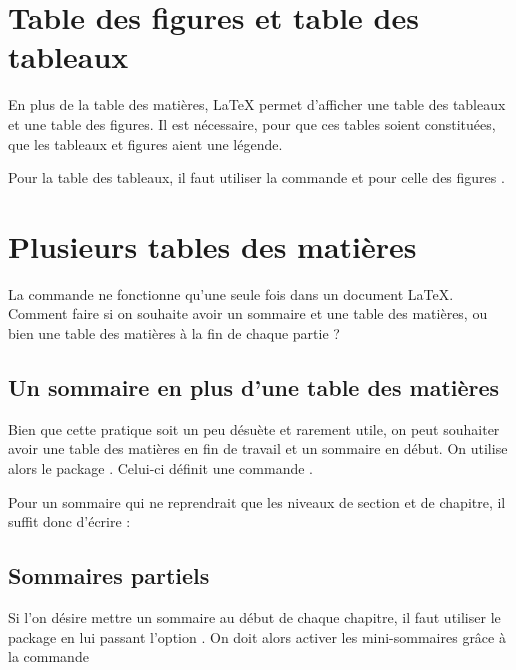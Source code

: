 \section{Table des figures et table des tableaux}\label{tablefigure}

En plus de la table des matières, \LaTeX{} permet d'afficher une table des tableaux et une table des figures. Il est nécessaire, pour que ces tables soient constituées, que les tableaux et figures aient une légende.

Pour la table des tableaux, il faut utiliser la commande  et pour celle des figures  .



\section{Plusieurs tables des matières}

La commande  ne fonctionne qu'une seule fois dans un document \LaTeX{}. Comment faire si on souhaite avoir un sommaire et une table des matières, ou bien une table des matières à la fin de chaque  partie ?

\subsection{Un sommaire en plus d'une table des matières}

Bien que cette pratique soit un peu désuète et rarement utile, on peut souhaiter  avoir une table des matières en fin de travail et un sommaire en début.
On utilise alors le package . Celui-ci définit une commande 
.

Pour un sommaire qui ne reprendrait que les niveaux de section et de chapitre, il suffit donc d'écrire :

\begin{latexcode}
\end{latexcode}




\subsection{Sommaires partiels}

Si l'on désire mettre un sommaire au début de chaque chapitre, il faut utiliser le package  en lui passant l'option . On doit alors activer les mini-sommaires grâce à la commande 

